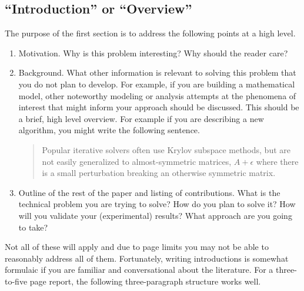 \documentclass[]{article}
\begin{document}
\subsection{``Introduction'' or ``Overview''}
The purpose of the first section is to address the following points at a high level.
\begin{enumerate}
    \item Motivation. Why is this problem interesting? Why should the reader care?
    \item Background. What other information is relevant to solving this problem that you do not plan to develop. For example, if you are building a mathematical model, other noteworthy modeling or analysis attempts at the phenomena of interest that might inform your approach should be discussed. This should be a brief, high level overview. For example if you are describing a new algorithm, you might write the following sentence.
    \begin{quote}
        Popular iterative solvers often use Krylov subspace methods, but are not easily generalized to almost-symmetric matrices, $A+\epsilon$ where there is a small perturbation breaking an otherwise symmetric matrix.
    \end{quote}

    \item Outline of the rest of the paper and listing of contributions. What is the technical problem you are trying to solve? How do you plan to solve it? How will you validate your (experimental) results?
          What approach are you going to take?
\end{enumerate}

Not all of these will apply and due to page limits you may not be able to reasonably address all of them. Fortunately, writing introductions is somewhat formulaic if you are familiar and conversational about the literature. For a three-to-five page report, the following three-paragraph structure works well.
\end{document}
